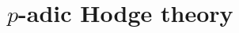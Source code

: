 \chapter{\texorpdfstring{$p$}{}-adic Hodge theory}
    \begin{abstract}
        
    \end{abstract}
    
    \minitoc